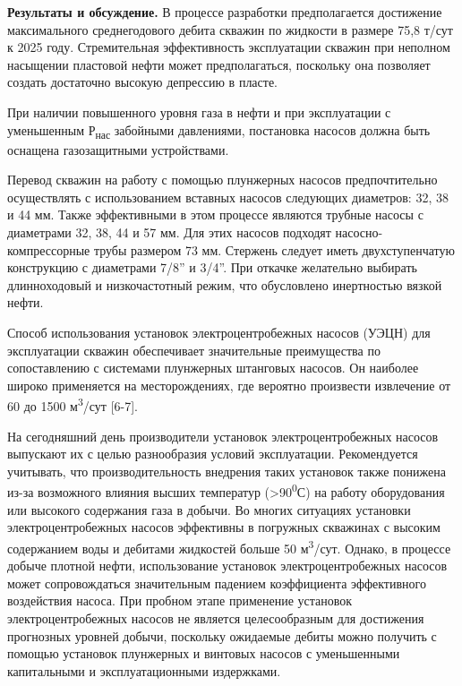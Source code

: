 \begin{multicols}{2}
{\bfseries Результаты и обсуждение.} В процессе разработки предполагается
достижение максимального среднегодового дебита скважин по жидкости в
размере 75,8 т/сут к 2025 году. Стремительная эффективность эксплуатации
скважин при неполном насыщении пластовой нефти может предполагаться,
поскольку она позволяет создать достаточно высокую депрессию в пласте.

При наличии повышенного уровня газа в нефти и при эксплуатации с
уменьшенным Р\textsubscript{нас} забойными давлениями, постановка
насосов должна быть оснащена газозащитными устройствами.

Перевод скважин на работу с помощью плунжерных насосов предпочтительно
осуществлять с использованием вставных насосов следующих диаметров: 32,
38 и 44 мм. Также эффективными в этом процессе являются трубные насосы с
диаметрами 32, 38, 44 и 57 мм. Для этих насосов подходят
насосно-компрессорные трубы размером 73 мм. Стержень следует иметь
двухступенчатую конструкцию с диаметрами
7/8''{} и
3/4''. При откачке желательно выбирать
длинноходовый и низкочастотный режим, что обусловлено инертностью вязкой
нефти.

Способ использования установок электроцентробежных насосов (УЭЦН) для
эксплуатации скважин обеспечивает значительные преимущества по
сопоставлению с системами плунжерных штанговых насосов. Он наиболее
широко применяется на месторождениях, где вероятно произвести извлечение
от 60 до 1500 м\textsuperscript{3}/сут {[}6-7{]}.

На сегодняшний день производители установок электроцентробежных насосов
выпускают их с целью разнообразия условий эксплуатации. Рекомендуется
учитывать, что производительность внедрения таких установок также
понижена из-за возможного влияния высших температур
(\textgreater90\textsuperscript{0}С) на работу оборудования или высокого
содержания газа в добычи. Во многих ситуациях установки
электроцентробежных насосов эффективны в погружных скважинах с высоким
содержанием воды и дебитами жидкостей больше 50
м\textsuperscript{3}/сут. Однако, в процессе добыче плотной нефти,
использование установок электроцентробежных насосов может сопровождаться
значительным падением коэффициента эффективного воздействия насоса. При
пробном этапе применение установок электроцентробежных насосов не
является целесообразным для достижения прогнозных уровней добычи,
поскольку ожидаемые дебиты можно получить с помощью установок плунжерных
и винтовых насосов с уменьшенными капитальными и эксплуатационными
издержками.


\end{multicols}
